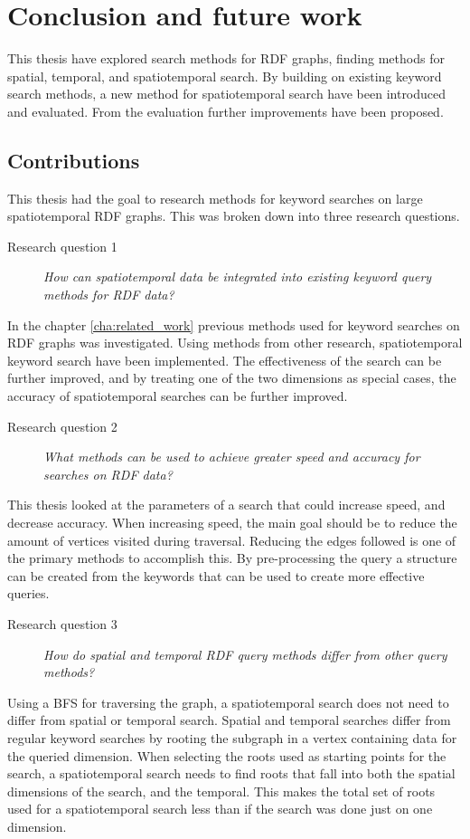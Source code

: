 \chapter{Conclusion and future work}
\label{cha:Conclusion}
This thesis have explored search methods for RDF graphs, finding methods for spatial, temporal, and spatiotemporal search. By building on existing keyword search methods, a new method for spatiotemporal search have been introduced and evaluated. From the evaluation further improvements have been proposed.

\section{Contributions}
\label{sec:Contributions}
This thesis had the goal to research methods for keyword searches on large spatiotemporal RDF graphs. This was broken down into three research questions.

\begin{description}
    \item[Research question 1] {\em How can spatiotemporal data be integrated into existing keyword query methods for RDF data?}
\end{description}
In the chapter \ref{cha:related_work} previous methods used for keyword searches on RDF graphs was investigated. Using methods from other research, spatiotemporal keyword search have been implemented. The effectiveness of the search can be further improved, and by treating one of the two dimensions as special cases, the accuracy of spatiotemporal searches can be further improved.

\begin{description}
    \item[Research question 2] {\em What methods can be used to achieve greater speed and accuracy for searches on RDF data?}
\end{description}
This thesis looked at the parameters of a search that could increase speed, and decrease accuracy. When increasing speed, the main goal should be to reduce the amount of vertices visited during traversal. Reducing the edges followed is one of the primary methods to accomplish this. By pre-processing the query a structure can be created from the keywords that can be used to create more effective queries.

\begin{description}
    \item[Research question 3] {\em How do spatial and temporal RDF query methods differ from other query methods?}
\end{description}
Using a BFS for traversing the graph, a spatiotemporal search does not need to differ from spatial or temporal search. Spatial and temporal searches differ from regular keyword searches by rooting the subgraph in a vertex containing data for the queried dimension. When selecting the roots used as starting points for the search, a spatiotemporal search needs to find roots that fall into both the spatial dimensions of the search, and the temporal. This makes the total set of roots used for a spatiotemporal search less than if the search was done just on one dimension.

